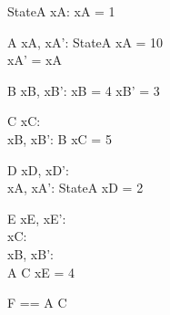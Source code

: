\begin{schema}{StateA}
xA: \nat
\where
xA = 1
\end{schema}



\begin{schema}{A}
xA, xA': \nat
\where
StateA \land xA = 10 \\
xA' = xA
\end{schema}



\begin{schema}{B}
xB, xB': \nat
\where
xB = 4 \iff xB' = 3
\end{schema}




\begin{schema}{C}
xC: \nat \\
xB, xB': \nat
\where
B \implies xC = 5
\end{schema}



\begin{schema}{D}
xD, xD': \nat \\
xA, xA': \nat
\where
\Delta StateA \land xD = 2
\end{schema}



\begin{schema}{E}
xE, xE': \nat \\
xC: \nat \\
xB, xB': \nat \\
A
\where
C \lor xE = 4
\end{schema}


\begin{zed}
F == A \lor C
\end{zed}
